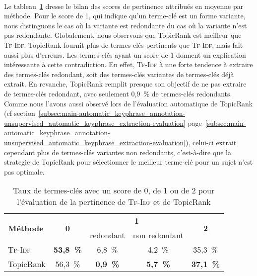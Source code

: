         ~\\Le
        tableau~\ref{tab:main-automatic_evaluation_of_keyphrase_annotation-results-topicrank-pertinence_score_ratio}
        dresse le bilan des scores de pertinence attribués en moyenne par
        méthode. Pour le score de 1, qui indique qu'un terme-clé est un forme
        variante, nous distinguons le cas où la variante est redondante du cas
        où la variante n'est pas redondante. Globalement, nous observons que
        TopicRank est meilleur que \textsc{Tf-Idf}. TopicRank fournit plus de
        termes-clés pertinents que \textsc{Tf-Idf}, mais fait aussi plus
        d'erreurs. Les termes-clés ayant un score de 1 donnent un explication
        intéressante à cette contradiction. En effet, \textsc{Tf-Idf} à une
        forte tendence à extraire des termes-clés redondant, soit des
        termes-clés variantes de termes-clés déjà extrait. En revanche,
        TopicRank remplit presque son objectif de ne pas extraire de termes-clés
        redondant, avec seulement 0,9~\% de termes-clés redondants. Comme nous
        l'avons aussi observé lors de l'évaluation automatique de TopicRank (cf
        section~\ref{subsec:main-automatic_keyphrase_annotation-unsupervised_automatic_keyphrase_extraction-evaluation}
        page~\ref{subsec:main-automatic_keyphrase_annotation-unsupervised_automatic_keyphrase_extraction-evaluation}),
        celui-ci extrait cependant plus de termes-clés variantes non redondants,
        c'est-à-dire que la strategie de TopicRank pour sélectionner le meilleur
        terme-clé pour un sujet n'est pas optimale.
        \begin{table}[h!]
          \centering
          \begin{tabular}{l|c|c|c|c}
            \toprule
            \multirow{2}{*}{\textbf{Méthode}} & \multirow{2}{*}{\textbf{0}} & \multicolumn{2}{c|}{\textbf{1}} & \multirow{2}{*}{\textbf{2}}\\
            \cline{3-4}
            & & \multicolumn{1}{p{.175\linewidth}|}{\centering{}redondant} & \multicolumn{1}{p{.175\linewidth}|}{\centering{}non redondant} &\\
            \hline
            \textsc{Tf-Idf} & \textbf{53,8~\%} & 6,8~\% & 4,2~\% & 35,3~\%\\
            TopicRank & 56,3~\% & \textbf{0,9~\%} & \textbf{5,7~\%} & \textbf{37,1~\%}\\
            \bottomrule
          \end{tabular}
          \caption{Taux de termes-clés avec un score de 0, de 1 ou de 2 pour
                   l'évaluation de la pertinence de \textsc{Tf-Idf} et de
                   TopicRank
                   \label{tab:main-automatic_evaluation_of_keyphrase_annotation-results-topicrank-pertinence_score_ratio}}
        \end{table}


